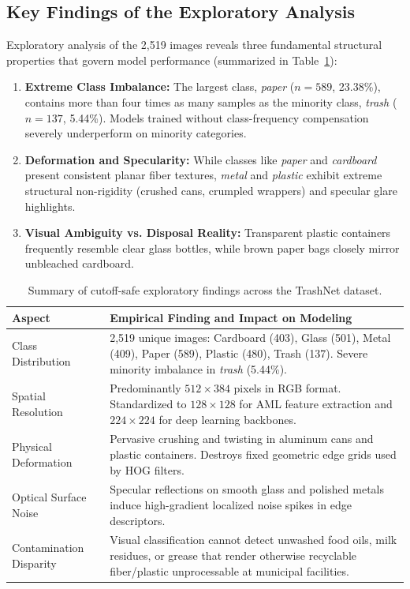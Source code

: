 \documentclass[11pt,a4paper]{article}
\begin{document}
\subsection{Key Findings of the Exploratory Analysis}
Exploratory analysis of the 2,519 images reveals three fundamental structural properties that govern model performance (summarized in Table~\ref{tab:exploratory_findings}):
\begin{enumerate}[label=\alph*.]
    \item \textbf{Extreme Class Imbalance:} The largest class, \textit{paper} ($n=589$, 23.38\%), contains more than four times as many samples as the minority class, \textit{trash} ($n=137$, 5.44\%). Models trained without class-frequency compensation severely underperform on minority categories.
    \item \textbf{Deformation and Specularity:} While classes like \textit{paper} and \textit{cardboard} present consistent planar fiber textures, \textit{metal} and \textit{plastic} exhibit extreme structural non-rigidity (crushed cans, crumpled wrappers) and specular glare highlights.
    \item \textbf{Visual Ambiguity vs. Disposal Reality:} Transparent plastic containers frequently resemble clear glass bottles, while brown paper bags closely mirror unbleached cardboard.
\end{enumerate}

\begin{table}[h!]
\centering
\caption{Summary of cutoff-safe exploratory findings across the TrashNet dataset.}
\label{tab:exploratory_findings}
\begin{tabularx}{\textwidth}{lX}
\toprule
\textbf{Aspect} & \textbf{Empirical Finding and Impact on Modeling} \\
\midrule
Class Distribution & 2,519 unique images: Cardboard (403), Glass (501), Metal (409), Paper (589), Plastic (480), Trash (137). Severe minority imbalance in \textit{trash} (5.44\%). \\
\addlinespace
Spatial Resolution & Predominantly $512 \times 384$ pixels in RGB format. Standardized to $128 \times 128$ for AML feature extraction and $224 \times 224$ for deep learning backbones. \\
\addlinespace
Physical Deformation & Pervasive crushing and twisting in aluminum cans and plastic containers. Destroys fixed geometric edge grids used by HOG filters. \\
\addlinespace
Optical Surface Noise & Specular reflections on smooth glass and polished metals induce high-gradient localized noise spikes in edge descriptors. \\
\addlinespace
Contamination Disparity & Visual classification cannot detect unwashed food oils, milk residues, or grease that render otherwise recyclable fiber/plastic unprocessable at municipal facilities. \\
\bottomrule
\end{tabularx}
\end{table}
\end{document}
